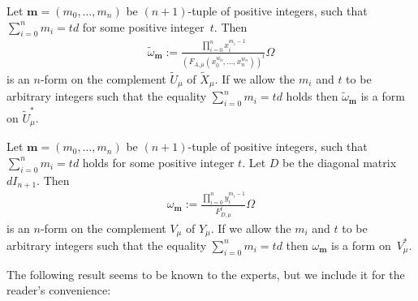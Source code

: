 \begin{notation}Let $\mathbf{m}=(m_0,\dots,m_n)$ be $(n+1)$-tuple of positive integers, such that $\sum\limits_{i=0}^n m_i =td$ for some positive integer~$t$. Then
\begin{gather*} \tilde{\omega}_{\mathbf{m}}:= \frac{\prod\limits_{i=0}^n x_i^{m_i-1}}{(F_{A,\mu}(x_0^{w_0},\dots,x_n^{w_n}))^t} \Omega\end{gather*}
is an $n$-form on the complement $\tilde{U}_{\mu}$ of $\tilde{X}_{\mu}$. If we allow the $m_i$ and $t$ to be arbitrary integers such that the equality $\sum\limits_{i=0}^n m_i=td$ holds then $\tilde{\omega}_{\mathbf{m}}$ is a form on $\tilde{U}^*_{\mu}$.

Let $\mathbf{m}=(m_0,\dots,m_n)$ be $(n+1)$-tuple of positive integers, such that $\sum\limits_{i=0}^n m_i =td$ holds for some positive integer $t$. Let $D$ be the diagonal matrix $d I_{n+1}$. Then
\begin{gather*} \omega_{\mathbf{m}}:= \frac{\prod\limits_{i=0}^n y_i^{m_i-1}}{F_{D,\mu}^t} \Omega\end{gather*}
is an $n$-form on the complement $V_{\mu}$ of $Y_{\mu}$. If we allow the $m_i$ and $t$ to be arbitrary integers such that the equality $\sum\limits_{i=0}^n m_i=td$ then $\omega_{\mathbf{m}}$ is a form on~$V^*_{\mu}$.
\end{notation}

The following result seems to be known to the experts, but we include it for the reader's convenience:

